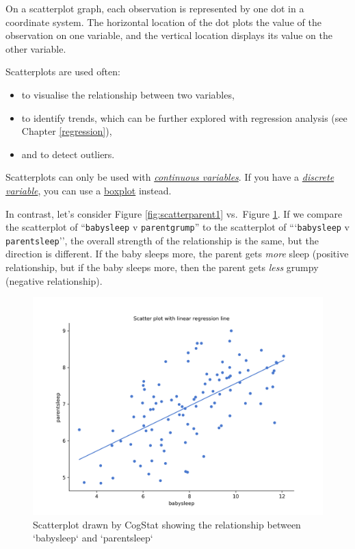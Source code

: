 \documentclass[
  11pt,
]{book}
\providecommand{\tightlist}{%
  \setlength{\itemsep}{0pt}\setlength{\parskip}{0pt}}
\theoremstyle{indenteddefinition}
\theoremstyle{indenteddefinition}
\theoremstyle{definition}
\theoremstyle{definition}
\theoremstyle{remark}
\begin{document}
\begin{callout}[Scatterplots]

On a scatterplot graph, each observation is represented by one dot in a coordinate system. The horizontal location of the dot plots the value of the observation on one variable, and the vertical location displays its value on the other variable.

Scatterplots are used often:

\begin{itemize}
\tightlist
\item
  to visualise the relationship between two variables,
\item
  to identify trends, which can be further explored with regression analysis (see Chapter \ref{regression}),
\item
  and to detect outliers.
\end{itemize}

Scatterplots can only be used with \protect\hyperlink{continuousdiscrete}{\emph{continuous variables}}. If you have a \protect\hyperlink{continuousdiscrete}{\emph{discrete variable}}, you can use a \protect\hyperlink{boxplots}{boxplot} instead.

\end{callout}

In contrast, let's consider Figure \ref{fig:scatterparent1} vs.~Figure \ref{fig:scatterparent2}. If we compare the scatterplot of ``\texttt{babysleep} v \texttt{parentgrump}'' to the scatterplot of ```\texttt{babysleep} v \texttt{parentsleep}'', the overall strength of the relationship is the same, but the direction is different. If the baby sleeps more, the parent gets \emph{more} sleep (positive relationship, but if the baby sleeps more, then the parent gets \emph{less} grumpy (negative relationship).

\begin{figure}

{\centering \includegraphics[width=0.66\linewidth]{resources/image/parentsleepbabysleepplot} 

}

\caption{Scatterplot drawn by CogStat showing the relationship between `babysleep` and `parentsleep`}\label{fig:scatterparent2}
\end{figure}
\end{document}
